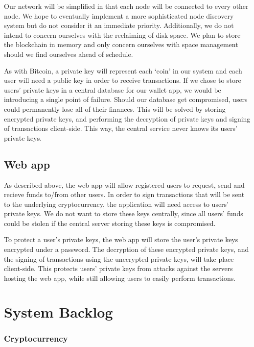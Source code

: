 \documentclass[12pt]{article}
\begin{document}
Our network will be simplified in that each node will be connected to every other node. We hope to eventually implement a more sophisticated node discovery system but do not consider it an immediate priority. Additionally, we do not intend to concern ourselves with the reclaiming of disk space. We plan to store the blockchain in memory and only concern ourselves with space management should we find ourselves ahead of schedule.

As with Bitcoin, a private key will represent each ‘coin’ in our system and each user will need a public key in order to receive transactions. If we chose to store users' private keys in a central database for our wallet app, we would be introducing a single point of failure. Should our database get compromised, users could permanently lose all of their finances. This will be solved by storing encrypted private keys, and performing the decryption of private keys and signing of transactions client-side. This way, the central service never knows its users' private keys.

\subsection*{Web app}

As described above, the web app will allow registered users to request, send and recieve funds to/from other users. In order to sign transactions that will be sent to the underlying cryptocurrency, the application will need access to users' private keys. We do not want to store these keys centrally, since all users' funds could be stolen if the central server storing these keys is compromised.

To protect a user's private keys, the web app will store the user's private keys encrypted under a password. The decryption of these encrypted private keys, and the signing of transactions using the unecrypted private keys, will take place client-side. This protects users' private keys from attacks against the servers hosting the web app, while still allowing users to easily perform transactions.

\section{System Backlog}

\subsubsection*{Cryptocurrency}
\end{document}
